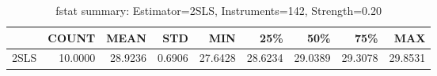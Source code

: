 \begin{table}[ht]
\centering
\caption{fstat summary: Estimator=2SLS, Instruments=142, Strength=0.20}
\begin{tabular}{lrrrrrrrr}
\toprule
 & COUNT & MEAN & STD & MIN & 25\% & 50\% & 75\% & MAX \\
\midrule
2SLS & 10.0000 & 28.9236 & 0.6906 & 27.6428 & 28.6234 & 29.0389 & 29.3078 & 29.8531 \\
\bottomrule
\end{tabular}
\end{table}
